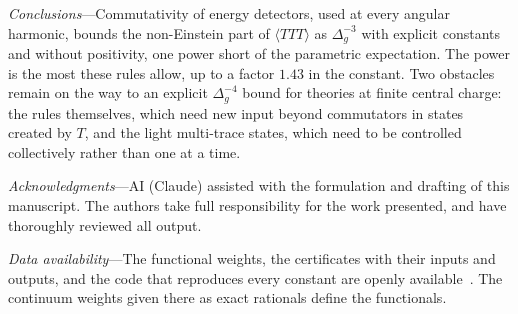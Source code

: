 \documentclass[aps,prl,twocolumn,superscriptaddress,nofootinbib,floatfix]{revtex4-2}
\begin{document}
\textit{Conclusions}---Commutativity of energy detectors, used at every angular harmonic, bounds the non-Einstein part of
$\langle TTT\rangle$ as $\Delta_g^{-3}$ with explicit constants and without positivity, one power short of the parametric expectation. The
power is the most these rules allow, up to a factor $1.43$ in the constant. Two obstacles remain on the way to an explicit
$\Delta_g^{-4}$ bound for theories at finite central charge: the rules themselves, which need new input beyond commutators in states created
by $T$, and the light multi-trace states, which need to be controlled collectively rather than one at a time.

\textit{Acknowledgments}---AI (Claude) assisted with the formulation and drafting of this manuscript. The authors take full
responsibility for the work presented, and have thoroughly reviewed all output.

\textit{Data availability}---The functional weights, the certificates with their inputs and outputs, and the
code that reproduces every constant are openly available~\cite{Zenodo}. The continuum weights given there as exact rationals define the functionals.


\end{document}

